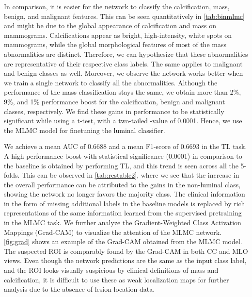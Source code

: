 \documentclass{article}
\begin{document}
   







 

In comparison, it is easier for the network to classify the calcification, mass, benign, and malignant features. This can be seen quantitatively in \cref{tab:binmlmc} and might be due to the global appearance of calcification and mass on mammograms. Calcifications appear as bright, high-intensity, white spots on mammograms, while the global morphological features of most of the mass abnormalities are distinct. Therefore, we can hypothesize that these abnormalities are representative of their respective class labels. The same applies to malignant and benign classes as well. Moreover, we observe the network works better when we train a single network to classify all the abnormalities. Although the performance of the mass classification stays the same, we obtain more than 2\%, 9\%, and 1\% performance boost for the calcification, benign and malignant classes, respectively. We find these gains in performance to be statistically significant while using a t-test, with a two-tailed -value of 0.0001. Hence, we use the MLMC model for finetuning the luminal classifier.  

We achieve a mean AUC of 0.6688 and a mean F1-score of 0.6693 in the TL task. A high-performance boost with statistical significance (0.0001) in comparison to the baseline is obtained by performing TL, and this trend is seen across all the 5-folds. This can be observed in \cref{tab:restable2}, where we see that the increase in the overall performance can be attributed to the gains in the non-luminal class, showing the network no longer favors the majority class. The clinical information in the form of missing additional labels in the baseline models is replaced by rich representations of the same information learned from the supervised pretraining in the MLMC task. 
We further analyze the Gradient-Weighted Class Activation Mappings (Grad-CAM) to visualize the attention of the MLMC network. \cref{fig:grad} shows an example of the Grad-CAM obtained from the MLMC model. The suspected ROI is comparably found by the Grad-CAM in both CC and MLO views. Even though the network predictions are the same as the input class label, and the ROI looks visually suspicious by clinical definitions of mass and calcification, it is difficult to use these as weak localization maps for further analysis due to the absence of lesion location data. 
\end{document}
